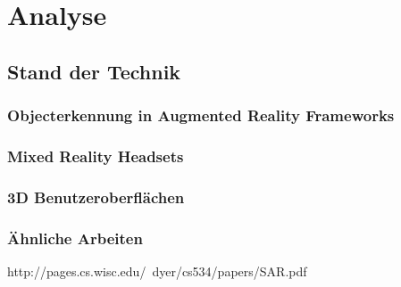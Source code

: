 \chapter{Analyse}

\section{Stand der Technik}

\subsection{Objecterkennung in Augmented Reality Frameworks}

\subsection{Mixed Reality Headsets}

\subsection{3D Benutzeroberflächen}

\subsection{Ähnliche Arbeiten}
http://pages.cs.wisc.edu/~dyer/cs534/papers/SAR.pdf